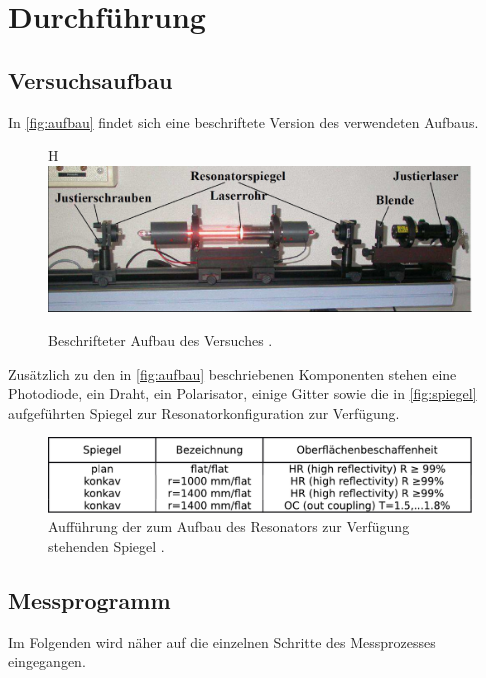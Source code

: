 \section{Durchführung}
\label{sec:Durchführung}

\subsection{Versuchsaufbau}

In \autoref{fig:aufbau} findet sich eine beschriftete Version des verwendeten Aufbaus.

\begin{figure}{H}
    \centering
    \includegraphics[width=\textwidth]{figures/Aufbau.pdf}
    \caption{Beschrifteter Aufbau des Versuches \cite{v61}.}
    \label{fig:aufbau}
\end{figure}

Zusätzlich zu den in \autoref{fig:aufbau} beschriebenen Komponenten stehen eine Photodiode, ein Draht, ein Polarisator, einige Gitter sowie die in \autoref{fig:spiegel} aufgeführten Spiegel zur Resonatorkonfiguration
zur Verfügung.

\begin{figure}[H]
    \centering
    \includegraphics[width=\textwidth]{figures/Spiegel.pdf}
    \caption{Aufführung der zum Aufbau des Resonators zur Verfügung stehenden Spiegel \cite{v61}.}
    \label{fig:spiegel}
\end{figure}

\subsection{Messprogramm}

Im Folgenden wird näher auf die einzelnen Schritte des Messprozesses eingegangen.

